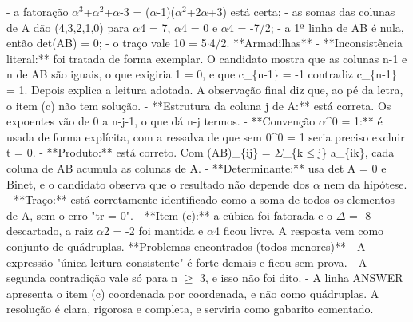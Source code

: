 \documentclass{article}%
\begin{document}
{-} a fatoração $\alpha$$^3$+$\alpha$$^2$+$\alpha$-3 = ($\alpha$-1)($\alpha$$^2$+2$\alpha$+3) está certa;\newline%
{-} as somas das colunas de A dão (4,3,2,1,0) para $\alpha$4 = 7, $\alpha$4 = 0 e $\alpha$4 = -7/2;\newline%
{-} a 1ª linha de AB é nula, então det(AB) = 0;\newline%
{-} o traço vale 10 = 5$\cdot$4/2.\newline%
\newline%
**Armadilhas**\newline%
{-} **Inconsistência literal:** foi tratada de forma exemplar. O candidato mostra que as colunas n-1 e n de AB são iguais, o que exigiria 1 = 0, e que c\_\{n-1\} = -1 contradiz c\_\{n-1\} = 1. Depois explica a leitura adotada. A observação final diz que, ao pé da letra, o item (c) não tem solução.\newline%
{-} **Estrutura da coluna j de A:** está correta. Os expoentes vão de 0 a n-j-1, o que dá n-j termos.\newline%
{-} **Convenção $\alpha$\^{}0 = 1:** é usada de forma explícita, com a ressalva de que sem 0\^{}0 = 1 seria preciso excluir t = 0.\newline%
{-} **Produto:** está correto. Com (AB)\_\{ij\} = $\Sigma$\_\{k$\leq$j\} a\_\{ik\}, cada coluna de AB acumula as colunas de A.\newline%
{-} **Determinante:** usa det A = 0 e Binet, e o candidato observa que o resultado não depende dos $\alpha$ nem da hipótese.\newline%
{-} **Traço:** está corretamente identificado como a soma de todos os elementos de A, sem o erro "tr = 0".\newline%
{-} **Item (c):** a cúbica foi fatorada e o $\Delta$ = -8 descartado, a raiz $\alpha$2 = -2 foi mantida e $\alpha$4 ficou livre. A resposta vem como conjunto de quádruplas.\newline%
\newline%
**Problemas encontrados (todos menores)**\newline%
{-} A expressão "única leitura consistente" é forte demais e ficou sem prova.\newline%
{-} A segunda contradição vale só para n $\geq$ 3, e isso não foi dito.\newline%
{-} A linha ANSWER apresenta o item (c) coordenada por coordenada, e não como quádruplas.\newline%
\newline%
A resolução é clara, rigorosa e completa, e serviria como gabarito comentado.%
$$
\end{document}
